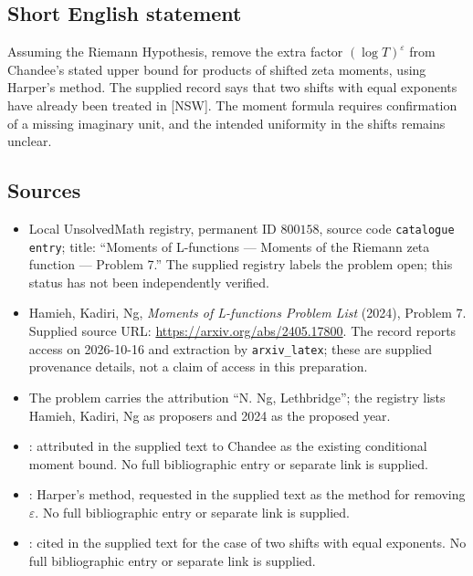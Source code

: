 \documentclass[11pt]{article}
\begin{document}
\subsection{Short English statement}
Assuming the Riemann Hypothesis, remove the extra factor \((\log T)^\varepsilon\) from Chandee's stated upper bound for products of shifted zeta moments, using Harper's method. The supplied record says that two shifts with equal exponents have already been treated in [NSW]. The moment formula requires confirmation of a missing imaginary unit, and the intended uniformity in the shifts remains unclear.
\subsection{Sources}
\begin{itemize}
\item Local UnsolvedMath registry, permanent ID \(800158\), source code \texttt{catalogue entry}; title: ``Moments of L-functions --- Moments of the Riemann zeta function --- Problem 7.'' The supplied registry labels the problem open; this status has not been independently verified.
\item Hamieh, Kadiri, Ng, \emph{Moments of L-functions Problem List} (2024), Problem 7. Supplied source URL: \url{https://arxiv.org/abs/2405.17800}. The record reports access on 2026-10-16 and extraction by \texttt{arxiv\_latex}; these are supplied provenance details, not a claim of access in this preparation.
\item The problem carries the attribution ``N. Ng, Lethbridge''; the registry lists Hamieh, Kadiri, Ng as proposers and 2024 as the proposed year.
\item [Ch, Theorem 1.2]: attributed in the supplied text to Chandee as the existing conditional moment bound. No full bibliographic entry or separate link is supplied.
\item [Ha]: Harper's method, requested in the supplied text as the method for removing \(\varepsilon\). No full bibliographic entry or separate link is supplied.
\item [NSW]: cited in the supplied text for the case of two shifts with equal exponents. No full bibliographic entry or separate link is supplied.
\end{itemize}
\end{document}
